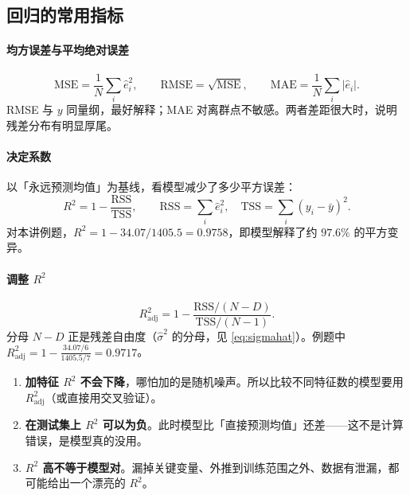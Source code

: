 \documentclass[11pt,a4paper,fontset=windows,zihao=-4]{ctexart}
\newcommand{\abs}[1]{\lvert #1\rvert}
\begin{document}
\subsection{回归的常用指标}

\paragraph{均方误差与平均绝对误差}
\begin{equation}
  \mathrm{MSE}=\frac{1}{N}\sum_i\hat e_i^2,\qquad
  \mathrm{RMSE}=\sqrt{\mathrm{MSE}},\qquad
  \mathrm{MAE}=\frac{1}{N}\sum_i\abs{\hat e_i}.
\end{equation}
RMSE 与 $y$ 同量纲，最好解释；MAE 对离群点不敏感。两者差距很大时，说明残差分布有明显厚尾。

\paragraph{决定系数}以「永远预测均值」为基线，看模型减少了多少平方误差：
\begin{equation}
  R^2=1-\frac{\mathrm{RSS}}{\mathrm{TSS}},
  \qquad \mathrm{RSS}=\sum_i\hat e_i^2,\quad
  \mathrm{TSS}=\sum_i(y_i-\bar y)^2 .
  \label{eq:r2}
\end{equation}
对本讲例题，$R^2=1-34.07/1405.5=0.9758$，即模型解释了约 $97.6\%$ 的平方变异。

\paragraph{调整 $R^2$}
\begin{equation}
  R^2_{\text{adj}}=1-\frac{\mathrm{RSS}/(N-D)}{\mathrm{TSS}/(N-1)} .
  \label{eq:r2adj}
\end{equation}
分母 $N-D$ 正是残差自由度（$\hat\sigma^2$ 的分母，见 \eqref{eq:sigmahat}）。例题中 $R^2_{\text{adj}}=1-\frac{34.07/6}{1405.5/7}=0.9717$。

\begin{warn}
\begin{enumerate}[label=(\arabic*),leftmargin=1.8em]
  \item \textbf{加特征 $R^2$ 不会下降}，哪怕加的是随机噪声。所以比较不同特征数的模型要用 $R^2_{\text{adj}}$（或直接用交叉验证）。
  \item \textbf{在测试集上 $R^2$ 可以为负}。此时模型比「直接预测均值」还差——这不是计算错误，是模型真的没用。
  \item \textbf{$R^2$ 高不等于模型对}。漏掉关键变量、外推到训练范围之外、数据有泄漏，都可能给出一个漂亮的 $R^2$。
\end{enumerate}
\end{warn}
\end{document}
